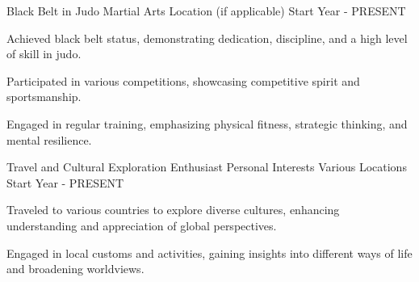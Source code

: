 

\begin{cventries}

  \cventry
    {Black Belt in Judo} %
    {Martial Arts} %
    {Location (if applicable)} %
    {Start Year - PRESENT} %
    {
      \begin{cvitems} %
        \item {Achieved black belt status, demonstrating dedication, discipline, and a high level of skill in judo.}
        \item {Participated in various competitions, showcasing competitive spirit and sportsmanship.}
        \item {Engaged in regular training, emphasizing physical fitness, strategic thinking, and mental resilience.}
      \end{cvitems}
    }

  \cventry
    {Travel and Cultural Exploration Enthusiast} %
    {Personal Interests} %
    {Various Locations} %
    {Start Year - PRESENT} %
    {
      \begin{cvitems}
        \item {Traveled to various countries to explore diverse cultures, enhancing understanding and appreciation of global perspectives.}
        \item {Engaged in local customs and activities, gaining insights into different ways of life and broadening worldviews.}
      \end{cvitems}
    }
\end{cventries}
